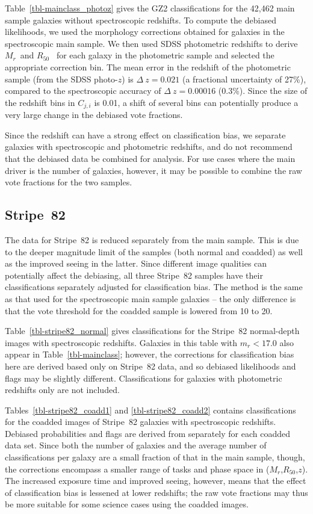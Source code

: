 \documentclass[useAMS,usenatbib]{mn2e}
\newcommand{\mr}{$M_r$}
\newcommand{\rfifty}{$R_{50}$}
\newcommand{\redshift}{$z$}
\begin{document}
Table~\ref{tbl-mainclass_photoz} gives the GZ2 classifications for the 42,462 main sample galaxies without spectroscopic redshifts. To compute the debiased likelihoods, we used the morphology corrections obtained for galaxies in the spectroscopic main sample. We then used SDSS photometric redshifts \citep{csa03} to derive \mr~and \rfifty~ for each galaxy in the photometric sample and selected the appropriate correction bin. The mean error in the redshift of the photometric sample (from the SDSS photo-$z$) is $\Delta~z=0.021$ (a fractional uncertainty of 27\%), compared to the spectroscopic accuracy of $\Delta~z=0.00016$ (0.3\%). Since the size of the redshift bins in $C_{j,i}$ is 0.01, a shift of several bins can potentially produce a very large change in the debiased vote fractions. 

Since the redshift can have a strong effect on classification bias, we separate galaxies with spectroscopic and photometric redshifts, and do not recommend that the debiased data be combined for analysis. For use cases where the main driver is the number of galaxies, however, it may be possible to combine the raw vote fractions for the two samples.

\subsection{Stripe~82}\label{ssec-s82}

The data for Stripe~82 is reduced separately from the main sample. This is due to the deeper magnitude limit of the samples (both normal and coadded) as well as the improved seeing in the latter. Since different image qualities can potentially affect the debiasing, all three Stripe~82 samples have their classifications separately adjusted for classification bias. The method is the same as that used for the spectroscopic main sample galaxies -- the only difference is that the vote threshold for the coadded sample is lowered from 10 to 20. 

Table~\ref{tbl-stripe82_normal} gives classifications for the Stripe~82 normal-depth images with spectroscopic redshifts. Galaxies in this table with $m_r < 17.0$ also appear in Table~\ref{tbl-mainclass}; however, the corrections for classification bias here are derived based only on Stripe~82 data, and so debiased likelihoods and flags may be slightly different. Classifications for galaxies with photometric redshifts only are not included.

Tables~\ref{tbl-stripe82_coadd1} and \ref{tbl-stripe82_coadd2} contains classifications for the coadded images of Stripe~82 galaxies with spectroscopic redshifts. Debiased probabilities and flags are derived from separately for each coadded data set. Since both the number of galaxies and the average number of classifications per galaxy are a small fraction of that in the main sample, though, the corrections encompass a smaller range of tasks and phase space in (\mr,\rfifty,\redshift). The increased exposure time and improved seeing, however, means that the effect of classification bias is lessened at lower redshifts; the raw vote fractions may thus be more suitable for some science cases using the coadded images. 
\end{document}
